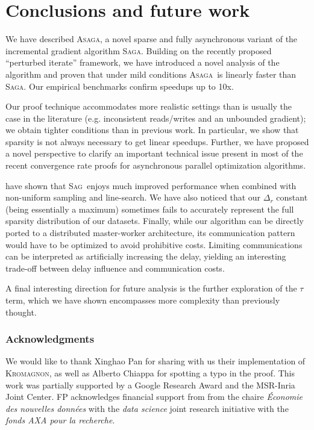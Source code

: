 \documentclass[twoside]{article}
\newcommand{\overlap}{\tau}
\newcommand{\sparsityr}{\Delta_r}
\newcommand{\note}[1]{{\textbf{\color{red}#1}}}
\newcommand{\ASAGA}{\textsc{Asaga}}
\newcommand{\SAGA}{\textsc{Saga}}
\newcommand{\SAG}{\textsc{Sag}}
\newcommand{\KROMAGNON}{\textsc{Kromagnon}}
\begin{document}
\vspace{-1.5mm}
\section{Conclusions and future work}
\vspace{-2.5mm}
We have described \ASAGA, a novel sparse and fully asynchronous variant of the incremental gradient algorithm \SAGA.
Building on the recently proposed ``perturbed iterate'' framework, we have introduced a novel analysis of the algorithm and proven that under mild conditions \ASAGA\ is linearly faster than \SAGA.
Our empirical benchmarks confirm speedups up to 10x.

Our proof technique accommodates more realistic settings than is usually the case in the literature (e.g. inconsistent reads/writes and an unbounded gradient); we obtain tighter conditions than in previous work. 
In particular, we show that sparsity is not always necessary to get linear speedups.
Further, we have proposed a novel perspective to clarify an important technical issue present in most of the recent convergence rate proofs for asynchronous parallel optimization algorithms.

\citet{laggedsaga} have shown that \SAG\ enjoys much improved performance when combined with non-uniform sampling and line-search.
We have also noticed that our $\sparsityr$ constant (being essentially a maximum) sometimes fails to accurately represent the full sparsity distribution of our datasets.
Finally, while our algorithm can be directly ported to a distributed master-worker architecture, its communication pattern would have to be optimized to avoid prohibitive costs. Limiting communications can be interpreted as artificially increasing the delay, yielding an interesting trade-off between delay influence and communication costs.

A final interesting direction for future analysis is the further exploration of the $\overlap$ term, which we have shown encompasses more complexity than previously thought.


\subsubsection*{Acknowledgments}
%
We would like to thank Xinghao Pan for sharing with us their implementation of \KROMAGNON, as well as Alberto Chiappa for spotting a typo in the proof.
%
This work was partially supported by a Google Research Award and the MSR-Inria Joint Center.
FP acknowledges financial support from
from the chaire {\em \'Economie des nouvelles donn\'ees} with the {\em data science} joint research initiative with the {\em fonds AXA pour la recherche}.
\end{document}
